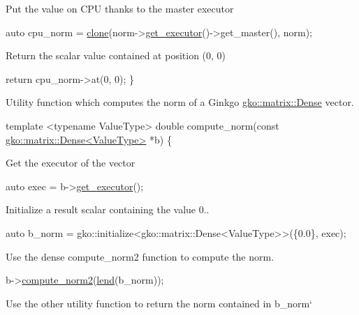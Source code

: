 Put the value on C\+PU thanks to the master executor


\begin{DoxyCode}
\textcolor{keyword}{auto} cpu\_norm = \hyperlink{namespacegko_a1beb80750459e4201aa9d882d2d074c3}{clone}(norm->\hyperlink{classgko_1_1PolymorphicObject_ab40586bff071b7f11c2cf6b5cbf598eb}{get\_executor}()->get\_master(), norm);
\end{DoxyCode}


Return the scalar value contained at position (0, 0)


\begin{DoxyCode}
    \textcolor{keywordflow}{return} cpu\_norm->at(0, 0);
\}
\end{DoxyCode}


Utility function which computes the norm of a Ginkgo \hyperlink{classgko_1_1matrix_1_1Dense}{gko\+::matrix\+::\+Dense} vector.


\begin{DoxyCode}
\textcolor{keyword}{template} <\textcolor{keyword}{typename} ValueType>
\textcolor{keywordtype}{double} compute\_norm(\textcolor{keyword}{const} \hyperlink{classgko_1_1matrix_1_1Dense}{gko::matrix::Dense<ValueType>} *b)
\{
\end{DoxyCode}


Get the executor of the vector


\begin{DoxyCode}
\textcolor{keyword}{auto} exec = b->\hyperlink{classgko_1_1PolymorphicObject_ab40586bff071b7f11c2cf6b5cbf598eb}{get\_executor}();
\end{DoxyCode}


Initialize a result scalar containing the value 0..


\begin{DoxyCode}
\textcolor{keyword}{auto} b\_norm = gko::initialize<gko::matrix::Dense<ValueType>>(\{0.0\}, exec);
\end{DoxyCode}


Use the dense {\ttfamily compute\+\_\+norm2} function to compute the norm.


\begin{DoxyCode}
b->\hyperlink{classgko_1_1matrix_1_1Dense_a97fd354c4a26814586cd256b5f0d7bea}{compute\_norm2}(\hyperlink{namespacegko_aa8cb4876b72e5e1036ea9575443c439b}{lend}(b\_norm));
\end{DoxyCode}


Use the other utility function to return the norm contained in {\ttfamily b\+\_\+norm}`


